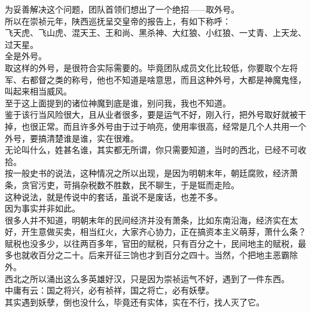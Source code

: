 \begin{multicols}{\theparacolNo}
为妥善解决这个问题，团队首领们想出了一个绝招——取外号。\\

所以在崇祯元年，陕西巡抚呈交皇帝的报告上，有如下称呼：\\

飞天虎、飞山虎、混天王、王和尚、黑杀神、大红狼、小红狼、一丈青、上天龙、过天星。\\

全是外号。\\

取这样的外号，是很符合实际需要的。毕竟团队成员文化比较低，你要取个左将军、右都督之类的称号，他也不知道是啥意思，而且这种外号，大都是神魔鬼怪，叫起来相当威风。\\

至于这上面提到的诸位神魔到底是谁，别问我，我也不知道。\\

鉴于该行当风险很大，且从业者很多，要是运气不好，刚入行，把外号取好就被干掉，也很正常。而且许多外号由于过于响亮，使用率很高，经常是几个人共用一个外号，要搞清楚谁是谁，实在很难。\\

无论叫什么，姓甚名谁，其实都无所谓，你只需要知道，当时的西北，已经不可收拾。\\

按一般史书的说法，这种情况之所以出现，是因为明朝末年，朝廷腐败，经济萧条，贪官污吏，苛捐杂税数不胜数，民不聊生，于是铤而走险。\\

这种说法，就是传说中的套话，虽说不是废话，也差不多。\\

因为事实并非如此。\\

很多人并不知道，明朝末年的民间经济并没有萧条，比如东南沿海，经济实在太好，开生意做买卖，相当红火，大家齐心协力，正在搞资本主义萌芽，萧什么条？\\

赋税也没多少，以往两百多年，官田的赋税，只有百分之十，民间地主的赋税，最多也就收百分之二十。后来开征三饷也才到百分之四十。当然，个把地主恶霸除外。\\

西北之所以涌出这么多英雄好汉，只是因为崇祯运气不好，遇到了一件东西。\\

中庸有云：国之将兴，必有祯祥，国之将亡，必有妖孽。\\

其实遇到妖孽，倒也没什么，毕竟还有实体，实在不行，找人灭了它。\\


\end{multicols}
